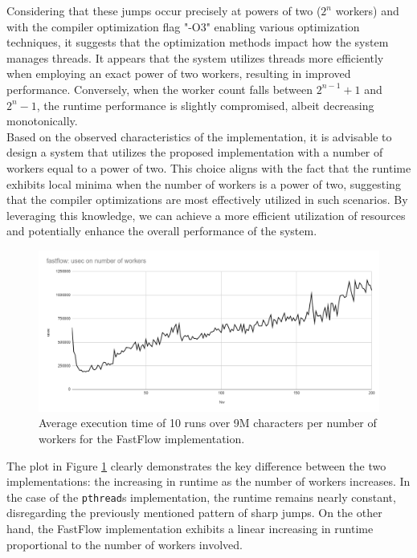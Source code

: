 \documentclass[10pt]{article}
\begin{document}
Considering that these jumps occur precisely at powers of two ($2^n$ workers) and with the compiler optimization flag "-O3" enabling various optimization techniques, it suggests that the optimization methods impact how the system manages threads. It appears that the system utilizes threads more efficiently when employing an exact power of two workers, resulting in improved performance. Conversely, when the worker count falls between $2^{n-1} + 1$ and $2^n - 1$, the runtime performance is slightly compromised, albeit decreasing monotonically.\\
Based on the observed characteristics of the implementation, it is advisable to design a system that utilizes the proposed implementation with a number of workers equal to a power of two. This choice aligns with the fact that the runtime exhibits local minima when the number of workers is a power of two, suggesting that the compiler optimizations are most effectively utilized in such scenarios. By leveraging this knowledge, we can achieve a more efficient utilization of resources and potentially enhance the overall performance of the system.
\begin{figure}[H]
\begin{center}
	\includegraphics[scale=.6]{scalability_fastflow.png}
\end{center}
\caption{Average execution time of 10 runs over 9M characters per number of workers for the FastFlow implementation.}
\label{figure:Scalability_fastflow}
\end{figure}
The plot in Figure \ref{figure:Scalability_fastflow} clearly demonstrates the key difference between the two implementations: the increasing in runtime as the number of workers increases. In the case of the \texttt{pthread}s implementation, the runtime remains nearly constant, disregarding the previously mentioned pattern of sharp jumps. On the other hand, the FastFlow implementation exhibits a linear increasing in runtime proportional to the number of workers involved.\\
\end{document}
